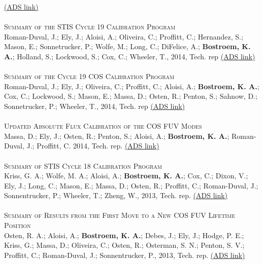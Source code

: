 \color{blue}\href{https://ui.adsabs.harvard.edu/#abs/2014stis.rept....2H/abstract}{(ADS link)}\color{black}\\ %
\\
\textsc{Summary of the STIS Cycle 19 Calibration Program}\\ 
Roman-Duval, J.; Ely, J.; Aloisi, A.; Oliveira, C.; Proffitt, C.; Hernandez, S.; Mason, E.; Sonnetrucker, P.; Wolfe, M.; Long, C.; DiFelice, A.; \textbf{Bostroem, K. A.}; Holland, S.; Lockwood, S.; Cox, C.; Wheeler, T., 2014, Tech. rep 
\color{blue}\href{https://ui.adsabs.harvard.edu/#abs/2014stis.rept....1R/abstract}{(ADS link)}\color{black}\\ %
\\
\textsc{Summary of the Cycle 19 COS Calibration Program}\\ 
Roman-Duval, J.; Ely, J.; Oliveira, C.; Proffitt, C.; Aloisi, A.; \textbf{Bostroem, K. A.}; Cox, C.; Lockwood, S.; Mason, E.; Massa, D.; Osten, R.; Penton, S.; Sahnow, D.; Sonnetrucker, P.; Wheeler, T., 2014, Tech. rep 
\color{blue}\href{https://ui.adsabs.harvard.edu/#abs/2014cos..rept....1R/abstract}{(ADS link)}\color{black}\\ %
\\
\textsc{Updated Absolute Flux Calibration of the COS FUV Modes}\\ 
Massa, D.; Ely, J.; Osten, R.; Penton, S.; Aloisi, A.; \textbf{Bostroem, K. A.}; Roman-Duval, J.; Proffitt, C. 2014, Tech. rep. 
\color{blue}\href{https://ui.adsabs.harvard.edu/#abs/2014cos..rept....9M/abstract}{(ADS link)}\color{black}\\ %
\\
\textsc{Summary of STIS Cycle 18 Calibration Program}\\ 
Kriss, G. A.; Wolfe, M. A.; Aloisi, A.; \textbf{Bostroem, K. A.}; Cox, C.; Dixon, V.; Ely, J.; Long, C.; Mason, E.; Massa, D.; Osten, R.; Proffitt, C.; Roman-Duval, J.; Sonnentrucker, P.; Wheeler, T.; Zheng, W., 2013, Tech. rep. 
\color{blue}\href{https://ui.adsabs.harvard.edu/#abs/2013stis.rept....3K/abstract}{(ADS link)}\color{black}\\ %
\\
\textsc{Summary of Results from the First Move to a New COS FUV Lifetime Position}\\ 
Osten, R. A.; Aloisi, A.; \textbf{Bostroem, K. A.};  Debes, J.; Ely, J.; Hodge, P. E.; Kriss, G.; Massa, D.; Oliveira, C.; Osten, R.; Osterman, S. N.; Penton, S. V.; Proffitt, C.; Roman-Duval, J.; Sonnentrucker, P., 2013, Tech. rep. 
\color{blue}\href{https://ui.adsabs.harvard.edu/#abs/2013cos..rept...16O/abstract}{(ADS link)}\color{black}\\ %
